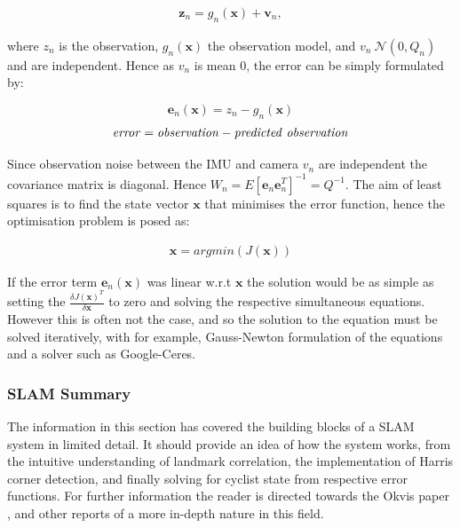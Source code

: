 \documentclass[11pt,twoside]{report}
\begin{document}
\begin{equation}
\begin{aligned}
\textbf{z}_{n} = g_{n}(\textbf{x}) + \textbf{v}_{n},
\end{aligned}
\end{equation} 

where $z_{n}$ is the observation, $g_{n}(\textbf{x})$ the observation model, and $v_{n} ~ \mathcal{N}(0,Q_{n})$ and are independent. Hence as $v_{n}$ is mean 0, the error can be simply formulated by:

\begin{equation}
\textbf{e}_{n}(\textbf{x}) = z_{n} - g_{n}(\textbf{x})
\end{equation}
\begin{equation}
\mathit{error = observation - predicted \textnormal{ } observation}
\end{equation}

Since observation noise between the IMU and camera $v_{n}$ are independent the covariance matrix is diagonal. Hence $W_{n} = E[\mathbf{e}_{n} \mathbf{e}_{n}^{T}]^{-1} = Q^{-1}$. The aim of least squares is to find the state vector $\mathbf{x}$ that minimises the error function, hence the optimisation problem is posed as:

\begin{equation}
\begin{aligned}
\textbf{x} = argmin(J(\mathbf{x}))
\end{aligned}
\end{equation}

If the error term $\mathbf{e}_{n}(\mathbf{x})$ was linear w.r.t $\mathbf{x}$ the solution would be as simple as setting the $\frac{\delta J(\mathbf{x})^{T}}{\delta \mathbf{x}}$ to zero and solving the respective simultaneous equations. However this is often not the case, and so the solution to the equation must be solved iteratively, with for example, Gauss-Newton formulation of the equations and a solver such as Google-Ceres.

\subsubsection{SLAM Summary}

The information in this section has covered the building blocks of a SLAM system in limited detail. It should provide an idea of how the system works, from the intuitive understanding of landmark correlation, the implementation of Harris corner detection, and finally solving for cyclist state from respective error functions. For further information the reader is directed towards the Okvis paper \cite{Okvis_1}, and other reports of a more in-depth nature in this field.
\end{document}
